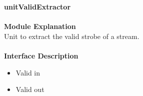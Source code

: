 \documentclass[../../../../doc/ASP-SoC_doc/main.tex]{subfiles}
\begin{document}
\textbf{unitValidExtractor}
\\\\
\textbf{Module Explanation}
\\
Unit to extract the valid strobe of a stream. \\
\\
\textbf{Interface Description}
\\
\begin{itemize}
  \item Valid in
  \item Valid out
\end{itemize}
\\
\end{document}

